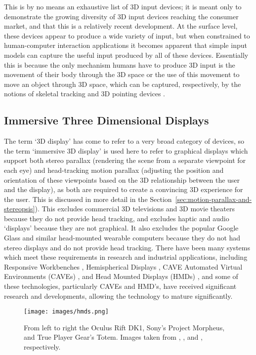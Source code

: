 This is by no means an exhaustive list of 3D input devices; it is meant only to demonstrate the growing diversity of 3D input devices reaching the consumer market, and that this is a relatively recent development. At the surface level, these devices appear to produce a wide variety of input, but when constrained to human-computer interaction applications it becomes apparent that simple input models can capture the useful input produced by all of these devices. Essentially this is because the only mechanism humans have to produce 3D input is the movement of their body through the 3D space or the use of this movement to move an object through 3D space, which can be captured, respectively, by the notions of skeletal tracking and 3D pointing devices \cite{jester}.

\subsection{Immersive Three Dimensional Displays}
\label{sec:3d-display}
	
	The term `3D display' has come to refer to a very broad category of devices, so the term `immersive 3D display' is used here to refer to graphical displays which support both stereo parallax (rendering the scene from a separate viewpoint for each eye) and head-tracking motion parallax (adjusting the position and orientation of these viewpoints based on the 3D relationship between the user and the display), as both are required to create a convincing 3D experience for the user. This is discussed in more detail in the Section~\ref{sec:motion-parallax-and-stereopsis}). This excludes commercial 3D televisions and 3D movie theaters because they do not provide head tracking, and excludes haptic and audio `displays' because they are not graphical. It also excludes the popular Google Glass and similar head-mounted wearable computers because they do not had stereo displays and do not provide head tracking. There have been many systems which meet these requirements in research and industrial applications, including Responsive Workbenches \cite{responsive-workbench}, Hemispherical Displays \cite{hemi-display}, CAVE Automated Virtual Environments (CAVEs) \cite{cave}, and Head Mounted Displays (HMDs) \cite{sutherland-hmd}, and some of these technologies, particularly CAVEs and HMD's, have received significant research and developments, allowing the technology to mature significantly.
	
\begin{figure}[ht!]
\centering
\texttt{[image: images/hmds.png]}
\caption{From left to right the Oculus Rift DK1, Sony's Project Morpheus, and True Player Gear's Totem. Images taken from \protect\cite{oculus-rift}, \protect\cite{project-morpheus}, and \protect\cite{true-player-gear}, respectively.}
\label{fig:hmds}
\end{figure}
 
